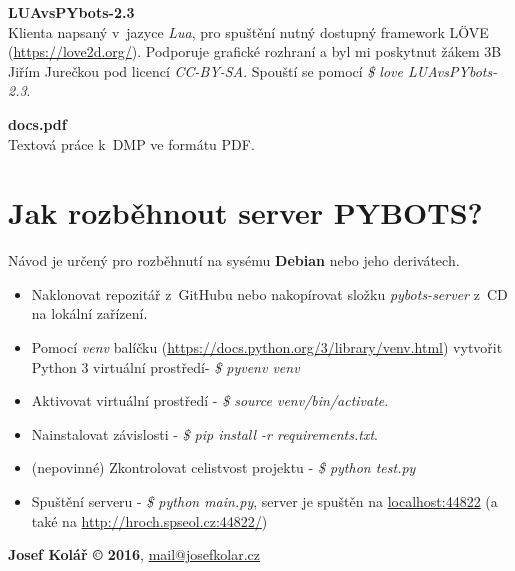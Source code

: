 \documentclass[11pt]{extarticle}
\begin{document}
\begin{description}
\begin{description}
			\item \textbf{LUAvsPYbots-2.3} \\
			Klienta napsaný v~jazyce \emph{Lua}, pro spuštění nutný dostupný framework LÖVE (\url{https://love2d.org/}). Podporuje grafické rozhraní a byl mi poskytnut žákem 3B Jiřím Jurečkou pod licencí \emph{CC-BY-SA}. Spouští se pomocí \emph{\$ love LUAvsPYbots-2.3}.
		\end{description}
		\item \textbf{docs.pdf}\\
			Textová práce k~DMP ve formátu PDF.
	\end{description}
	{\centering \section*{Jak rozběhnout server PYBOTS?}}
	Návod je určený pro rozběhnutí na sysému \textbf{Debian} nebo jeho derivátech.
	\begin{itemize}
		\item Naklonovat repozitář z~GitHubu nebo nakopírovat složku \emph{pybots-server} z~CD na lokální zařízení.
		\item Pomocí \emph{venv} balíčku (\url{https://docs.python.org/3/library/venv.html}) vytvořit Python 3 virtuální prostředí- \emph{\$ pyvenv venv}
		\item Aktivovat virtuální prostředí - \emph{\$ source venv/bin/activate}.
		\item Nainstalovat závislosti - \emph{\$ pip install -r requirements.txt}.
		\item (nepovinné) Zkontrolovat celistvost projektu - \emph{\$ python test.py}
		\item Spuštění serveru - \emph{\$ python main.py}, server je spuštěn na \url{localhost:44822} (a také na \url{http://hroch.spseol.cz:44822/})
	\end{itemize}
	{\hfill \textbf{Josef Kolář \copyright{} 2016}, \url{mail@josefkolar.cz}}
\end{document}

